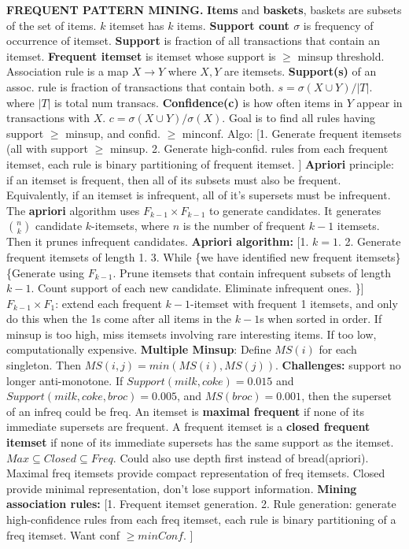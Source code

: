 \documentclass{amsbook}
\theoremstyle{plain}
\theoremstyle{definition}
\theoremstyle{remark}
\newcommand{\sub}{\subseteq}
\begin{document}
\textbf{FREQUENT PATTERN MINING. } \textbf{Items} and \textbf{baskets}, baskets are subsets of the set of items. $k$ itemset has $k$ items. \textbf{Support count $\sigma$} is frequency of occurrence of itemset. \textbf{Support} is fraction of all transactions that contain an itemset. \textbf{Frequent itemset} is itemset whose support is $\geq$ minsup threshold. Association rule is a map $X \to Y$ where $X,Y$ are itemsets. \textbf{Support(s)} of an assoc. rule is fraction of transactions that contain both. $s = \sigma(X \cup Y)/|T|$. where $|T|$ is total num transacs. \textbf{Confidence(c)} is how often items in $Y$ appear in transactions with $X$. $c = \sigma(X \cup Y)/\sigma(X)$. Goal is to find all rules having support $\geq$ minsup, and confid. $\geq $ minconf. Algo: [1. Generate frequent itemsets (all with support $\geq$ minsup. 2. Generate high-confid. rules from each frequent itemset, each rule is binary partitioning of frequent itemset. ] \textbf{Apriori} principle: if an itemset is frequent, then all of its subsets must also be frequent. Equivalently, if an itemset is infrequent, all of it's supersets must be infrequent. The \textbf{apriori} algorithm uses $F_{k - 1} \times F_{k - 1}$ to generate candidates. It generates $\binom{n}{k}$ candidate $k$-itemsets, where $n$ is the number of frequent $k - 1$ itemsets. Then it prunes infrequent candidates. \textbf{Apriori algorithm: }[1. $k = 1$. 2. Generate frequent itemsets of length 1. 3. While \{we have identified new frequent itemsets\}\{Generate using $F_{k - 1}$. Prune itemsets that contain infrequent subsets of length $k - 1$. Count support of each new candidate. Eliminate infrequent ones. \}] $F_{k - 1} \times F_1$: extend each frequent $k - 1$-itemset with frequent 1 itemsets, and only do this when the 1s come after all items in the $k - 1$s when sorted in order. If minsup is too high, miss itemsets involving rare interesting items. If too low, computationally expensive. \textbf{Multiple Minsup}: Define $MS(i)$ for each singleton. Then $MS(i,j) = min(MS(i),MS(j))$. \textbf{Challenges: }support no longer anti-monotone. If $Support(milk,coke) = 0.015$ and $Support(milk,coke,broc) = 0.005$, and $MS(broc) = 0.001$, then the superset of an infreq could be freq. An itemset is \textbf{maximal frequent} if none of its immediate supersets are frequent. A frequent itemset is a \textbf{closed frequent itemset} if none of its immediate supersets has the same support as the itemset. $Max\sub Closed\sub Freq$. Could also use depth first instead of bread(apriori). Maximal freq itemsets provide compact representation of freq itemsets. Closed provide minimal representation, don't lose support information. \textbf{Mining association rules: }[1. Frequent itemset generation. 2. Rule generation: generate high-confidence rules from each freq itemset, each rule is binary partitioning of a freq itemset. Want conf $\geq minConf$. ]
\end{document}
